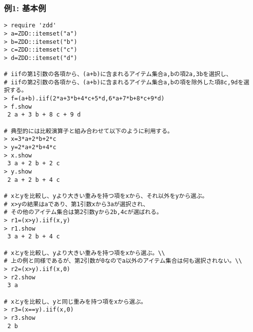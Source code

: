 \subsubsection*{例1: 基本例}



\begin{Verbatim}[baselinestretch=0.7,frame=single]
> require 'zdd'
> a=ZDD::itemset("a")
> b=ZDD::itemset("b")
> c=ZDD::itemset("c")
> d=ZDD::itemset("d")

# iifの第1引数の各項から、(a+b)に含まれるアイテム集合a,bの項2a,3bを選択し、
# iifの第2引数の各項から、(a+b)に含まれるアイテム集合a,bの項を除外した項8c,9dを選択する。
> f=(a+b).iif(2*a+3*b+4*c+5*d,6*a+7*b+8*c+9*d)
> f.show
 2 a + 3 b + 8 c + 9 d

# 典型的には比較演算子と組み合わせて以下のように利用する。
> x=3*a+2*b+2*c
> y=2*a+2*b+4*c
> x.show
 3 a + 2 b + 2 c
> y.show
 2 a + 2 b + 4 c

# xとyを比較し、yより大きい重みを持つ項をxから、それ以外をyから選ぶ。
# x>yの結果はaであり、第1引数xから3aが選択され、
# その他のアイテム集合は第2引数yから2b,4cが選ばれる。
> r1=(x>y).iif(x,y)
> r1.show
 3 a + 2 b + 4 c

# xとyを比較し、yより大きい重みを持つ項をxから選ぶ。\\
# 上の例と同様であるが、第2引数が0なのでa以外のアイテム集合は何も選択されない。\\
> r2=(x>y).iif(x,0)
> r2.show
 3 a

# xとyを比較し、yと同じ重みを持つ項をxから選ぶ。
> r3=(x==y).iif(x,0)
> r3.show
 2 b
\end{Verbatim}
